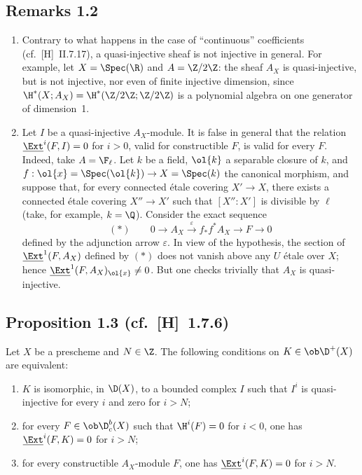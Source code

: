 \subsection*{Remarks 1.2}
\begin{enumerate}[label=\alph*)]
\item Contrary to what happens in the case of ``continuous'' coefficients (cf.~[H]~II.7.17), a quasi-injective sheaf is not injective in general. For example, let $X = \Spec(\R)$ and $A = \Z/2\Z$: the sheaf $A_X$ is quasi-injective, but is not injective, nor even of finite injective dimension, since $\H^{*}(X; A_X) = \H^{*}(\Z/2\Z; \Z/2\Z)$ is a polynomial algebra on one generator of dimension~1.

\item Let $I$ be a quasi-injective $A_X$-module. It is false in general that the relation $\underline{\Ext}^i(F,I) = 0$ for $i > 0$, valid for constructible $F$, is valid for every $F$. Indeed, take $A = \F_{\ell}$. Let $k$ be a field, $\ol{k}$ a separable closure of $k$, and $f : \ol{x} = \Spec(\ol{k}) \to X = \Spec(k)$ the canonical morphism, and suppose that, for every connected étale covering $X' \to X$, there exists a connected étale covering $X'' \to X'$ such that $[X'':X']$ is divisible by $\ell$ (take, for example, $k = \Q$). Consider the exact sequence
\[
(*) \qquad 0 \longrightarrow A_X \xrightarrow{\;\varepsilon\;} f_{*}f^{*}A_X \longrightarrow F \longrightarrow 0
\]
defined by the adjunction arrow $\varepsilon$. In view of the hypothesis, the section of $\underline{\Ext}^1(F,A_X)$ defined by $(*)$ does not vanish above any $U$ étale over $X$; hence $\underline{\Ext}^1(F,A_X)_{\ol{x}} \neq 0$. But one checks trivially that $A_X$ is quasi-injective.
\end{enumerate}

\subsection*{Proposition 1.3 {\normalfont (cf.~[H]~1.7.6)}}
Let $X$ be a prescheme and $N \in \Z$. The following conditions on $K \in \ob \D^{+}(X)$ are equivalent:
\begin{enumerate}[label=(\roman*)]
\item $K$ is isomorphic, in $\D(X)$, to a bounded complex $I$ such that $I^i$ is quasi-injective for every $i$ and zero for $i > N$;
\item for every $F \in \ob \D_c^{b}(X)$ such that $\H^i(F) = 0$ for $i < 0$, one has $\underline{\Ext}^i(F,K) = 0$ for $i > N$;
\item for every constructible $A_X$-module $F$, one has $\underline{\Ext}^i(F,K) = 0$ for $i > N$.
\end{enumerate}

